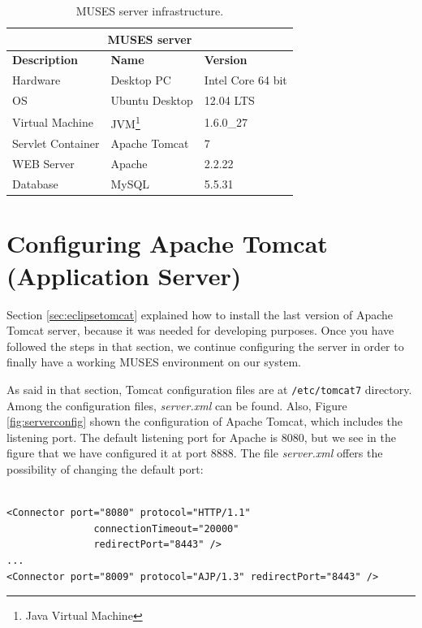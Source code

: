 \documentclass[a4paper,11pt]{book}
\begin{document}
\begin{table}[!htbp]
  \caption{MUSES server infrastructure.}
  \label{tab:server_infrastructure}

  \begin{center}
    \begin{tabular}{ |l|l|l| }
    \hline
    \multicolumn{3}{|c|}{\textbf{MUSES server}} \\
    \hline
    \textbf{Description} & \textbf{Name} & \textbf{Version} \\
    \hline
    Hardware & Desktop PC & Intel Core 64 bit \\
    OS & Ubuntu Desktop & 12.04 LTS \\
    Virtual Machine & JVM\footnote{Java Virtual Machine} & 1.6.0\_27 \\
    Servlet Container & Apache Tomcat & 7 \\
    WEB Server & Apache & 2.2.22 \\
    Database & MySQL & 5.5.31 \\
    \hline
    \end{tabular}
  \end{center}
\end{table}

\section{Configuring Apache Tomcat (Application Server)}
\label{sec:tomcat}

Section \ref{sec:eclipsetomcat} explained how to install the last version of Apache Tomcat server, because it was needed for developing purposes. Once you have followed the steps in that section, we continue configuring the server in order to finally have a working MUSES environment on our system.

As said in that section, Tomcat configuration files are at \texttt{/etc/tomcat7} directory. Among the configuration files, \textit{server.xml} can be found. Also, Figure \ref{fig:serverconfig} shown the configuration of Apache Tomcat, which includes the listening port. The default listening port for Apache is 8080, but we see in the figure that we have configured it at port 8888. The file \textit{server.xml} offers the possibility of changing the default port:
\\
\\
\begin{verbatim}
<Connector port="8080" protocol="HTTP/1.1" 
               connectionTimeout="20000" 
               redirectPort="8443" />
...
<Connector port="8009" protocol="AJP/1.3" redirectPort="8443" />
\end{verbatim}
\end{document}
